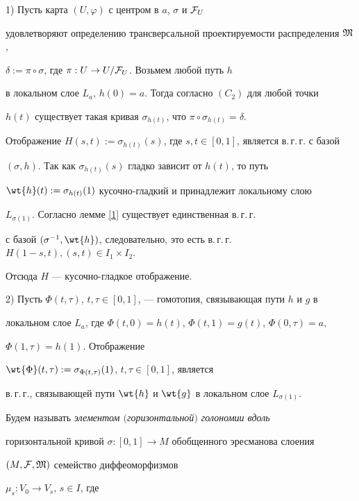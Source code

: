 \begin{pf}


1) Пусть карта $(U,\varphi)$ с центром в $a$, $\sigma$ и ${\cal F}_U$


удовлетворяют определению трансверсальной проектируемости распределения $\frak M$,


$\delta:=\pi\circ\sigma$, где $\pi: U\to U/{\cal F}_U$. Возьмем любой путь $h$


в локальном слое $L_a$, $h(0)=a$. Тогда согласно $(C_2)$ для любой точки


$h(t)$ существует такая кривая $\sigma_{h(t)}$, что $\pi\circ\sigma_{h(t)}=\delta$.


Отображение $H(s,t):=\sigma_{h(t)}(s)$, где $s,t\in [0,1]$, является в.\,г.\,г. с базой


$(\sigma,h)$. Так как $\sigma_{h(t)}(s)$ гладко зависит от $h(t)$, то путь


$\wt{h}(t):=\sigma_{h(t)}(1)$ кусочно-гладкий и принадлежит локальному слою


$L_{\sigma(1)}$. Согласно лемме \ref{1} существует единственная в.\,г.\,г.


с базой $(\sigma^{-1},


\wt{h})$, следовательно, это есть в.\,г.\,г. $H(1-s,t), (s,t)\in I_1\times I_2$.


Отсюда $H$ --- кусочно-гладкое отображение.





2) Пусть $\Phi (t,\tau)$, $t,\tau\in [0,1]$, --- гомотопия, связывающая пути $h$ и $g$ в


локальном слое $L_a$, где $\Phi(t,0)=h(t)$, $\Phi(t,1)=g(t)$, $\Phi(0,\tau)=a$,


$\Phi(1,\tau)=h(1)$. Отображение


$\wt{\Phi}(t,\tau):=\sigma_{\Phi(t,\tau)}(1)$, $t,\tau\in [0,1]$, является


в.\,г.\,г., связывающей пути $\wt{h}$ и $\wt{g}$ в локальном слое $L_{\sigma(1)}$.


\end{pf}





Будем называть {\it элементом $($горизонтальной$)$ голономии вдоль}


горизонтальной кривой $\sigma:[0,1]\to M$ обобщенного эресманова слоения


$(M,{\cal F},\frak M)$ семейство диффеоморфизмов


$\mu_s: V_0\to V_s$, $s\in I$, где


